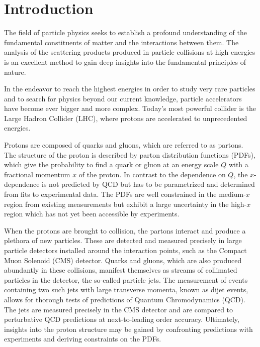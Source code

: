 
\chapter{Introduction}

The field of particle physics seeks to establish a profound understanding
of the fundamental constituents of matter and the interactions between them.
The analysis of the scattering products produced in particle collisions at high
energies is an excellent method to gain deep insights into the fundamental
principles of nature.

In the endeavor to reach the highest energies in order to study very rare
particles and to search for physics beyond our current knowledge, particle
accelerators have become ever bigger and more complex. Today's most powerful collider
is the Large Hadron Collider (LHC), where protons are accelerated to unprecedented energies. 

Protons are composed of quarks and gluons, which are referred to as partons.
The structure of the proton is described by parton distribution functions
(PDFs), which give the probability to find a quark or gluon at an
energy scale $Q$ with a fractional momentum $x$ of the proton. In contrast to
the dependence on $Q$, the $x$-dependence is not predicted by QCD but has to be parametrized and
determined from fits to experimental data. The PDFs are well constrained in the
medium-$x$ region from existing measurements but exhibit a large uncertainty in
the high-$x$ region which has not yet been accessible by experiments.

When the protons are brought to collision, the partons interact and produce a
plethora of new particles. These are detected and measured precisely in large
particle detectors installed around the interaction points, such as the Compact
Muon Solenoid (CMS) detector. Quarks and gluons, which are also produced
abundantly in these collisions, manifest themselves as streams of collimated
particles in the detector, the so-called particle jets. The measurement of events
containing two such jets with large transverse momenta, known as dijet events,
allows for thorough tests of predictions of Quantum Chromodynamics (QCD). The
jets are measured precisely in the CMS detector and are compared to perturbative
QCD predictions at next-to-leading order accuracy. Ultimately, insights into
the proton structure may be gained by confronting predictions with experiments
and deriving constraints on the PDFs.

